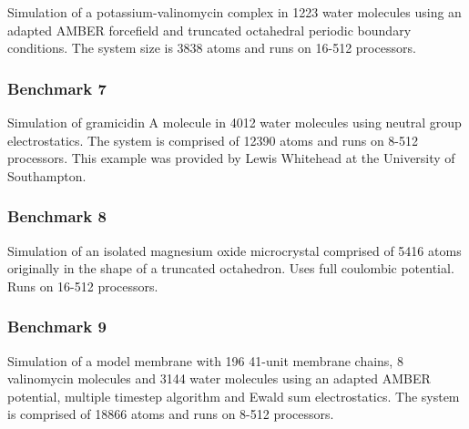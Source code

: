 Simulation of a potassium-valinomycin complex in 1223 water molecules
using an adapted AMBER forcefield and truncated octahedral periodic
boundary conditions. The system size is 3838 atoms and runs on 16-512
processors.

\subsubsection{Benchmark 7}

Simulation of gramicidin A molecule in 4012 water molecules using
neutral group electrostatics. The system is comprised of 12390 atoms
and runs on 8-512 processors. This example was provided by Lewis
Whitehead at the University of Southampton.

\subsubsection{Benchmark 8}

Simulation of an isolated magnesium oxide microcrystal comprised of
5416 atoms originally in the shape of a truncated octahedron. Uses
full coulombic potential. Runs on 16-512 processors.

\subsubsection{Benchmark 9}

Simulation of a model membrane with 196 41-unit membrane chains, 8
valinomycin molecules and 3144 water molecules using an adapted AMBER
potential, multiple timestep algorithm and Ewald sum electrostatics. 
The system is comprised of 18866 atoms and runs on 8-512 processors.

\clearpage


